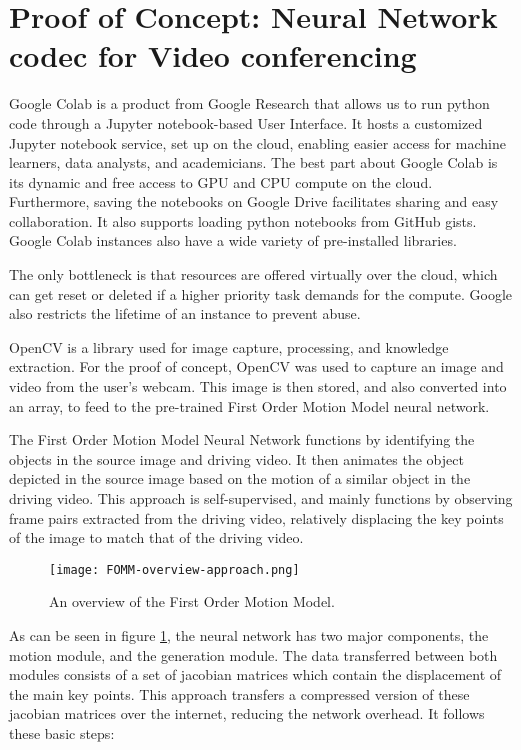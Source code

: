 \section{Proof of Concept: Neural Network codec for Video conferencing}

Google Colab is a product from Google Research that allows us to run python code through a Jupyter notebook-based User Interface. 
It hosts a customized Jupyter notebook service, set up on the cloud, enabling easier access for machine learners, data analysts, and academicians. The best part about Google Colab is its dynamic and free access to GPU and CPU compute on the cloud. Furthermore, saving the notebooks on Google Drive facilitates sharing and easy collaboration. It also supports loading python notebooks from GitHub gists. 
Google Colab instances also have a wide variety of pre-installed libraries.

The only bottleneck is that resources are offered virtually over the cloud, which can get reset or deleted if a higher priority task demands for the compute. Google also restricts the lifetime of an instance to prevent abuse.

OpenCV is a library used for image capture, processing, and knowledge extraction. For the proof of concept, OpenCV was used to capture an image and video from the user's webcam. This image is then stored, and also converted into an array, to feed to the pre-trained First Order Motion Model 
neural network.

The First Order Motion Model Neural Network functions by identifying the objects in the source image and driving video. It then animates the object depicted in the source image based on the motion of a similar object in the driving video. This approach is self-supervised, and mainly functions by 
observing frame pairs extracted from the driving video, relatively displacing the key points of the image to match that of the driving video.

\begin{figure}[h]
    \begin{center}
        \texttt{[image: FOMM-overview-approach.png]}
    \end{center}
    \caption{An overview of the First Order Motion Model.}
    \label{fig:FOMMoverview}
\end{figure}

As can be seen in figure \ref{fig:FOMMoverview}, the neural network has two major components, the motion module, and the generation module. 
The data transferred between both modules consists of a set of jacobian matrices which contain the displacement of the main key points. 
This approach transfers a compressed version of these jacobian matrices over the internet, reducing the network overhead. It follows these basic steps: 

